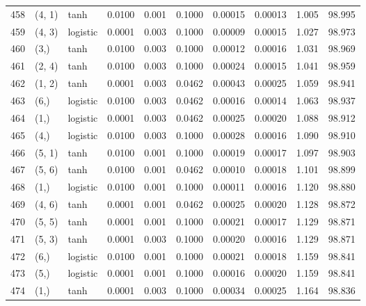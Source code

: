 \begin{tabular}{lllrrrrrrr}
458 &      (4, 1) &      tanh &  0.0100 &  0.001 &  0.1000 &          0.00015 &    0.00013 &       1.005 &    98.995 \\
459 &      (4, 3) &  logistic &  0.0001 &  0.003 &  0.1000 &          0.00009 &    0.00015 &       1.027 &    98.973 \\
460 &        (3,) &      tanh &  0.0100 &  0.003 &  0.1000 &          0.00012 &    0.00016 &       1.031 &    98.969 \\
461 &      (2, 4) &      tanh &  0.0100 &  0.003 &  0.1000 &          0.00024 &    0.00015 &       1.041 &    98.959 \\
462 &      (1, 2) &      tanh &  0.0001 &  0.003 &  0.0462 &          0.00043 &    0.00025 &       1.059 &    98.941 \\
463 &        (6,) &  logistic &  0.0100 &  0.003 &  0.0462 &          0.00016 &    0.00014 &       1.063 &    98.937 \\
464 &        (1,) &  logistic &  0.0001 &  0.003 &  0.0462 &          0.00025 &    0.00020 &       1.088 &    98.912 \\
465 &        (4,) &  logistic &  0.0100 &  0.003 &  0.1000 &          0.00028 &    0.00016 &       1.090 &    98.910 \\
466 &      (5, 1) &      tanh &  0.0100 &  0.001 &  0.1000 &          0.00019 &    0.00017 &       1.097 &    98.903 \\
467 &      (5, 6) &      tanh &  0.0100 &  0.001 &  0.0462 &          0.00010 &    0.00018 &       1.101 &    98.899 \\
468 &        (1,) &  logistic &  0.0100 &  0.001 &  0.1000 &          0.00011 &    0.00016 &       1.120 &    98.880 \\
469 &      (4, 6) &      tanh &  0.0001 &  0.001 &  0.0462 &          0.00025 &    0.00020 &       1.128 &    98.872 \\
470 &      (5, 5) &      tanh &  0.0001 &  0.001 &  0.1000 &          0.00021 &    0.00017 &       1.129 &    98.871 \\
471 &      (5, 3) &      tanh &  0.0001 &  0.003 &  0.1000 &          0.00020 &    0.00016 &       1.129 &    98.871 \\
472 &        (6,) &  logistic &  0.0100 &  0.001 &  0.1000 &          0.00021 &    0.00018 &       1.159 &    98.841 \\
473 &        (5,) &  logistic &  0.0001 &  0.001 &  0.1000 &          0.00016 &    0.00020 &       1.159 &    98.841 \\
474 &        (1,) &      tanh &  0.0001 &  0.003 &  0.1000 &          0.00034 &    0.00025 &       1.164 &    98.836 \\

\end{tabular}
